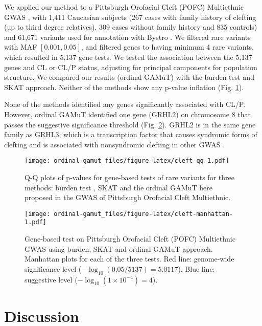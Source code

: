\documentclass[]{article}
\theoremstyle{definition}
\theoremstyle{definition}
\theoremstyle{definition}
\theoremstyle{remark}
\begin{document}
We applied our method to a Pittsburgh Orofacial Cleft (POFC) Multiethnic
GWAS \citep{Leslie2016}, \citep{Leslie2016b} with 1,411 Caucasian
subjects (267 cases with family history of clefting (up to third degree
relatives), 309 cases without family history and 835 controls) and
61,671 variants used for annotation with Bystro \citep{Kotlar2018}. We
filtered rare variants with MAF \([0.001,0.05]\), and filtered genes to
having minimum 4 rare variants, which resulted in 5,137 gene tests. We
tested the association between the 5,137 genes and CL or CL/P status,
adjusting for principal components for population structure. We compared
our results (ordinal GAMuT) with the burden test and SKAT approach.
Neither of the methods show any p-value inflation (Fig.
\ref{fig:cleft-qq}).

None of the methods identified any genes significantly associated with
CL/P. However, ordinal GAMuT identified one gene (GRHL2) on chromosome 8
that passes the suggestive significance threshold (Fig.
\ref{fig:cleft-manhattan}). GRHL2 is in the same gene family as GRHL3,
which is a transcription factor that causes syndromic forms of clefting
and is associated with nonsyndromic clefting in other GWAS
\citep{Leslie2016, Leslie2016b, Carpinelli2017, PeyrardJanvid2014}.

\begin{figure}
\centering
\texttt{[image: ordinal-gamut\_files/figure-latex/cleft-qq-1.pdf]}
\caption{\label{fig:cleft-qq}Q-Q plots of p-values for gene-based tests of
rare variants for three methods: burden test \citep{Li2008}, SKAT
\citep{Wu2011} and the ordinal GAMuT here proposed in the GWAS of
Pittsburgh Orofacial Cleft Multiethnic.}
\end{figure}

\begin{figure}
\centering
\texttt{[image: ordinal-gamut\_files/figure-latex/cleft-manhattan-1.pdf]}
\caption{\label{fig:cleft-manhattan}Gene-based test on Pittsburgh Orofacial
Cleft (POFC) Multiethnic GWAS using burden, SKAT and ordinal GAMuT
approach. Manhattan plots for each of the three tests. Red line:
genome-wide significance level (\(-\log_{10}(0.05/5137) = 5.0117\)).
Blue line: suggestive level (\(-\log_{10}(1 \times 10 ^{-4}) = 4\)).}
\end{figure}

\hypertarget{discussion}{%
\section{Discussion}\label{discussion}}
\end{document}

